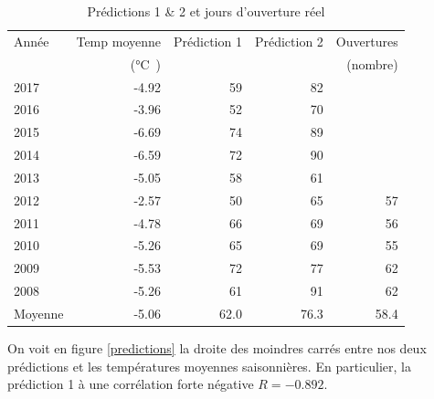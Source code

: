 \documentclass[12pt]{article}
\numberwithin{figure}{section}
\numberwithin{table}{section}
\begin{document}
\begin{table}
    \centering
    \begin{tabular}{|l|r|r|r|r|}\hline
        Ann\'ee &Temp moyenne &Pr\'ediction 1 &Pr\'ediction 2 &Ouvertures\\
                &(\si\celsius) & & &(nombre)\\\hline
        2017 &-4.92 &59 &82 &\\\hline
        2016 &-3.96 &52 &70 &\\\hline
        2015 &-6.69 &74 &89 &\\\hline
        2014 &-6.59 &72 &90 &\\\hline
        2013 &-5.05 &58 &61 &\\\hline
        2012 &-2.57 &50 &65 &57\\\hline
        2011 &-4.78 &66 &69 &56\\\hline
        2010 &-5.26 &65 &69 &55\\\hline
        2009 &-5.53 &72 &77 &62\\\hline
        2008 &-5.26 &61 &91 &62\\\hline
        Moyenne &-5.06 &62.0 &76.3 &58.4\\\hline
    \end{tabular}
    \caption{Pr\'edictions 1 \& 2 et jours d'ouverture r\'eel}\label{data:predict}
\end{table}

On voit en figure \ref{predictions} la droite des moindres carr\'es entre nos deux pr\'edictions et
les temp\'eratures moyennes saisonni\`eres. En particulier, la pr\'ediction 1 \`a une corr\'elation
forte n\'egative $R = -0.892$.
\end{document}

